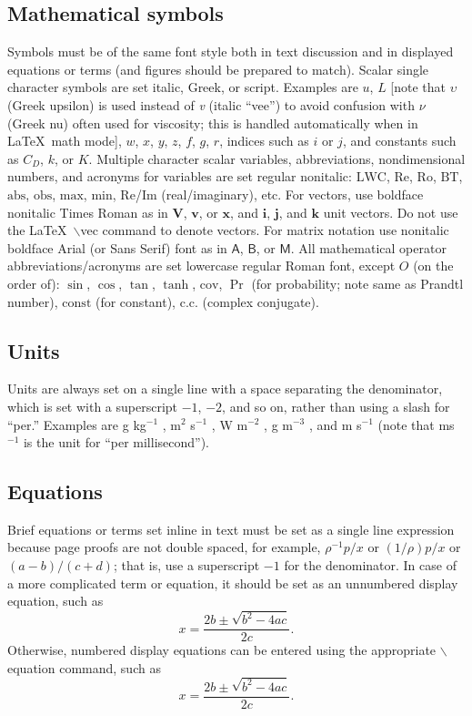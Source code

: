 \documentclass[12pt]{article}
\begin{document}
\subsection{Mathematical symbols}
Symbols must be of the same font style both in text discussion and in displayed
equations or terms (and figures should be prepared to match). Scalar
single character symbols are set italic, Greek, or script. Examples
are $u$, $L$ [note that $\upsilon$ (Greek upsilon) is used instead of
\textit{v} (italic ``vee'') to avoid confusion with
 $\nu$ (Greek nu) often used for viscosity; this is handled automatically
when in \LaTeX\ math mode], $w$, $x$, $y$, $z$, $f$, $g$, $r$, indices such as $i$ or $j$, and constants such as $C_D$, $k$,
or $K$. Multiple character scalar variables, abbreviations, nondimensional numbers, and acronyms for
variables are set regular nonitalic: $\mathrm{LWC}$, $\mathrm{Re}$, $\mathrm{Ro}$, $\mathrm{BT}$, $\mathrm{abs}$, $\mathrm{obs}$, $\mathrm{max}$, $\mathrm{min}$, $\mathrm{Re}$/$\mathrm{Im}$ (real/imaginary), etc.
For vectors, use boldface nonitalic Times Roman as in $\mathbf{V}$,
$\mathbf{v}$, or $\mathbf{x}$, and $\mathbf{i}$, $\mathbf{j}$, and $\mathbf{k}$ unit
vectors. Do not use the \LaTeX\ $\backslash$vec command to denote vectors. For
matrix notation use nonitalic boldface Arial (or Sans Serif) font as in
$\bm{\mathsf{A}}$, $\bm{\mathsf{B}}$, or $\bm{\mathsf{M}}$. All mathematical operator abbreviations/acronyms are set lowercase regular
Roman font, except $O$ (on the order of): $\sin$, $\cos$, $\tan$, $\tanh$, $\mathrm{cov}$, $\Pr$ (for probability; note same as
Prandtl number), $\mathrm{const}$ (for constant), $\mathrm{c.c.}$ (complex conjugate).

\subsection{Units}
Units are always set on a single line with a space separating the denominator, which is set with a
superscript $-1$, $-2$, and so on, rather than using a slash for ``per.'' Examples are g kg$^{-1}$ , m$^2$ s$^{-1}$ , W m$^{-2}$ , g
m$^{-3}$ , and m s$^{-1}$ (note that ms$^{-1}$ is the unit for ``per millisecond'').

\subsection{Equations}
Brief equations or terms set inline in text must be set as a
single line expression because page proofs are not double spaced, for
example, $\rho^{-1}p/x$ or $(1/{\rho})p/x$  or $(a-b)/(c+d)$; that is,
use a superscript $-1$ for the denominator. In case of a more complicated
term or equation, it should be set as an unnumbered display equation,
such as
\begin{displaymath}
x=\frac{2b\pm\sqrt{b^{2}-4ac}}{2c}.
\end{displaymath}
Otherwise, numbered display equations can be entered using the appropriate
$\backslash$equation command, such as
\begin{equation}
x=\frac{2b\pm\sqrt{b^{2}-4ac}}{2c}.
\end{equation}
\end{document}
